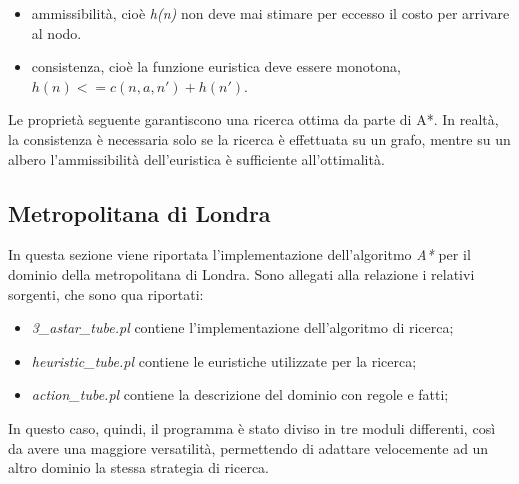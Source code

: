 \documentclass[12pt]{report}
\begin{document}
\begin{itemize}
\item ammissibilità, cioè \emph{h(n)} non deve mai stimare per eccesso il costo per arrivare al nodo.
\item consistenza, cioè la funzione euristica deve essere monotona, $h(n) <= c(n, a, n') + h(n')$.
\end{itemize}

Le proprietà seguente garantiscono una ricerca ottima da parte di {A*}. In realtà, la consistenza è necessaria solo se la ricerca è effettuata su un grafo, mentre su un albero l'ammissibilità dell'euristica è sufficiente all'ottimalità.

\subsection{Metropolitana di Londra}
In questa sezione viene riportata l'implementazione dell'algoritmo \emph{A*} per il dominio della metropolitana di Londra.
Sono allegati alla relazione i relativi sorgenti, che sono qua riportati:

\begin{itemize}
\item \emph{3\_astar\_tube.pl} contiene l'implementazione dell'algoritmo di ricerca;
\item \emph{heuristic\_tube.pl} contiene le euristiche utilizzate per la ricerca;
\item \emph{action\_tube.pl} contiene la descrizione del dominio con regole e fatti;
\end{itemize}

In questo caso, quindi, il programma \`e stato diviso in tre moduli differenti, cos\`i da avere una maggiore versatilit\`a, permettendo di adattare velocemente ad un altro dominio la stessa strategia di ricerca.
\end{document}
